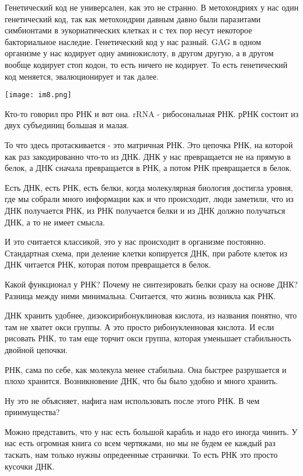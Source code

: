 Генетический код не универсален, как это не странно. В метохондриях
у нас один генетический код, так как метохондрии давным давно были 
паразитами симбионтами в эукориатических клетках и с тех 
пор несут некоторое бакториальное наследие. Генетический код 
у нас разный. GAG в одном организме у нас кодирует 
одну аминокислоту, в другом другую, а в другом вообще кодирует 
стоп кодон, то есть ничего не кодирует. То есть 
генетический код меняется, эвалюционирует и 
так далее.

\texttt{[image: im8.png]}

Кто-то говорил про РНК и вот она. rRNA - рибосональная 
РНК. рРНК состоит из двух субъединиц большая и малая. 

То что здесь протаскивается - это матричная РНК. Это 
цепочка РНК, на которой как раз закодированно что-то из 
ДНК. ДНК у нас превращается не на прямую в белок, 
а ДНК сначала превращается в РНК, 
а потом РНК превращается в белок. 

Есть ДНК, есть РНК, есть белки, когда молекулярная 
биология достигла уровня, где мы собрали много информации 
как и что происходит, люди заметили, что из 
ДНК получается РНК, из РНК получается белки и из 
ДНК должно получаться ДНК, а то не имеет смысла. 

И это считается классикой, это у нас 
происходит в организме постоянно. Стандартная схема, 
при деление клетки копируется ДНК, при работе клеток 
из ДНК читается РНК, которая потом превращается в белок. 

Какой функционал у РНК? Почему не синтезировать 
белки сразу на основе ДНК? Разница между ними минимальна. 
Считается, что жизнь возникла как РНК. 

ДНК хранить удобнее, дизоксирибонуклиновая кислота, из 
названия понятно, что там не хватет окси группы. А это 
просто рибонуклеиновая кислота. И если рисовать РНК, то 
там еще торчит окси группа, которая уменьшает стабильность 
двойной цепочки. 

РНК, сама по себе, как молекула менее стабильна. Она быстрее 
разрушается и плохо хранится. Возникновение ДНК, что бы 
было удобно и много хранить. 

Ну это не объясняет, нафига нам использовать после этого РНК. В чем 
приимущества? 

Можно представить, что у нас есть большой карабль и надо его 
иногда чинить. У нас есть огромная книга со всем чертяжами, 
но мы не будем ее каждый раз таскать, нам только нужны опредеенные странички. 
То есть РНК это просто кусочки ДНК. 

